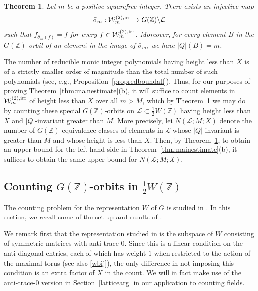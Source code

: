 \documentclass[11pt]{article}
\def\Z{{\mathbb Z}}
\def\irr{{\rm irr}}
\def\U{{\mathcal W}}
\def\Z{{\mathbb Z}}
\def\LL{{\mathcal L}}
\def\w{{\rm {(2)}}}
\newtheorem{theorem}{Theorem}[section]
\begin{document}
\begin{theorem}\label{keymaporbit}
Let $m$ be a positive squarefree integer. There exists an injective map
$$\bar{\sigma}_m:\U_m^{\w,\irr}\to G(\Z)\backslash\LL$$ such that
$f_{\bar{\sigma}_m(f)}=f$ for every $f\in \U_m^{\w,\irr}$. Moreover,
for every element $B$ in the $G(\Z)$-orbit of an element in the image
of $\bar{\sigma}_m$, we have $|Q|(B)=m$.
\end{theorem}

The number of reducible monic integer
polynomials having height less than $X$ is of a strictly smaller order
of magnitude than the total number of such polynomials (see, e.g.,
Proposition~\ref{propredboundall}).  Thus, for our purposes of proving
Theorem~\ref{thm:mainestimate}(b), it will suffice to count elements
in $\U_m^{\w,\irr}$ of height less than $X$ over all $m>M$, which by
Theorem~\ref{keymaporbit} we may do by counting these special
$G(\Z)$-orbits on $\LL\subset \frac12W(\Z)$ having height less than
$X$ and $|Q|$-invariant greater than $M$.  More precisely, let
$N(\LL;M;X)$ denote the number of $G(\Z)$-equivalence classes of
elements in $\LL$ whose $|Q|$-invariant is greater than $M$ and whose
height is less than $X$.  Then, by Theorem~\ref{keymaporbit}, to
obtain an upper bound for the left hand side in
Theorem~\ref{thm:mainestimate}(b), it suffices to obtain the same
upper bound for $N(\LL;M;X)$.

\subsection{Counting $G(\Z)$-orbits in $\frac12W(\Z)$}

The counting problem for the representation $W$ of $G$ is studied in
\cite{BG2}. In this section, we recall some of the set up and results
of \cite{BG2}.

We remark first that the representation studied in \cite{BG2} is the
subspace of $W$ consisting of symmetric matrices with anti-trace
$0$. Since this is a linear condition on the anti-diagonal entries,
each of which has weight $1$ when restricted to the action of the
maximal torus (see also \eqref{wbij}), the only difference in not
imposing this condition is an extra factor of $X$ in the count. We
will in fact make use of the anti-trace-$0$ version in Section~\ref{latticearg} in our
application to counting fields.
\end{document}
